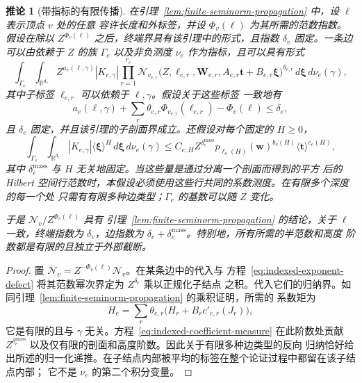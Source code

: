 \documentclass[11pt,a4paper]{article}
\numberwithin{equation}{section}
\numberwithin{figure}{section}
\newtheorem{corollary}[theorem]{推论}
\theoremstyle{definition}
\theoremstyle{remark}
\begin{document}
\begin{corollary}[带指标的有限传播]
\label{cor:indexed-seminorm-propagation}
在引理~\ref{lem:finite-seminorm-propagation} 中，设 $\boldsymbol\ell$ 表示顶点 $v$ 处的任意
容许长度和外标签，并设 $\Phi_v(\boldsymbol\ell)$ 为其所需的范数指数。假设在除以
$Z^{\Phi_v(\boldsymbol\ell)}$ 之后，终端界具有该引理中的形式，且指数 $\delta_v$ 固定。一条边
可以由依赖于 $Z$ 的族 $\Gamma_e$ 以及非负测度 $\nu_e$ 作为指标，且可以具有形式
\[
 \int_{\Gamma_e}\int_{\mathbb R^{d_e}}
 Z^{a_e(\boldsymbol\ell,\gamma)}|K_{e,\gamma}|
 \prod_{r=1}^{r_e}\mathcal N_{v_{e,r}}
  \bigl(Z,\boldsymbol\ell_{e,r},\boldsymbol W_{e,r},
        A_{e,r}\boldsymbol t+B_{e,r}\boldsymbol\xi\bigr)^{\theta_{e,r}}
 \,d\boldsymbol\xi\,d\nu_e(\gamma),
\]
其中子标签 $\boldsymbol\ell_{e,r}$ 可以依赖于 $\boldsymbol\ell,\gamma$。假设关于这些标签
一致地有
\begin{equation}\label{eq:indexed-exponent-defect}
 a_e(\boldsymbol\ell,\gamma)
   +\sum_r\theta_{e,r}\Phi_{v_{e,r}}(\boldsymbol\ell_{e,r})
   -\Phi_v(\boldsymbol\ell)\le\delta_e,
\end{equation}
且 $\delta_e$ 固定，并且该引理的子剖面界成立。还假设对每个固定的 $H\ge0$，
\begin{equation}\label{eq:indexed-coefficient-measure}
 \int_{\Gamma_e}\int_{\mathbb R^{d_e}}|K_{e,\gamma}|
       \langle\boldsymbol\xi\rangle^H\,d\boldsymbol\xi\,d\nu_e(\gamma)
 \le C_{e,H}Z^{\delta_e^{\mathrm{mass}}}
       p_{\ell_e(H)}(\boldsymbol w)^{b_e(H)}
       \langle\boldsymbol t\rangle^{c_e(H)},
\end{equation}
其中 $\delta_e^{\mathrm{mass}}$ 与 $H$ 无关地固定。当这些量是通过分离一个剖面而得到的平方
后的 Hilbert 空间行范数时，本假设必须使用这些行共同的系数测度。在有限多个深度的每一个处
只需有有限多种边类型；$\Gamma_e$ 的基数可以随 $Z$ 变化。

于是 $\mathcal N_v/Z^{\Phi_v(\boldsymbol\ell)}$ 具有
引理~\ref{lem:finite-seminorm-propagation} 的结论，关于 $\boldsymbol\ell$ 一致，终端指数为
$\delta_v$，边指数为 $\delta_e+\delta_e^{\mathrm{mass}}$。特别地，所有所需的半范数和高度
阶数都是有限的且独立于外部截断。
\end{corollary}

\begin{proof}
置 $\overline{\mathcal N}_v=Z^{-\Phi_v(\boldsymbol\ell)}\mathcal N_v$。在某条边中的代入与
方程~\eqref{eq:indexed-exponent-defect} 将其范数幂次界定为 $Z^{\delta_e}$ 乘以正规化子结点
之积。代入它们的归纳界。如同引理~\ref{lem:finite-seminorm-propagation} 的乘积证明，所需的
系数矩为
\[
 H_e=\sum_r\theta_{e,r}
              \bigl(H_r+B_r c'_{e,r}(J_r)\bigr),
\]
它是有限的且与 $\gamma$ 无关。方程~\eqref{eq:indexed-coefficient-measure} 在此阶数处贡献
$Z^{\delta_e^{\mathrm{mass}}}$ 以及仅有限的剖面和高度阶数。因此关于有限多种边类型的反向
归纳恰好给出所述的归一化递推。在子结点内部被平均的标签在整个论证过程中都留在该子结点内部；
它不是 $\nu_e$ 的第二个积分变量。
\end{proof}
\end{document}
